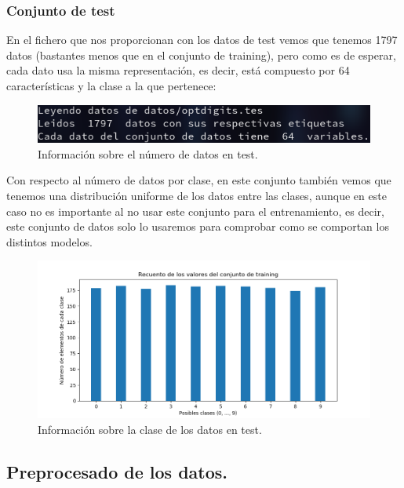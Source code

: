 \documentclass[12pt, spanish]{article}
\begin{document}
\subsubsection{Conjunto de test}

En el fichero que nos proporcionan con los datos de test vemos que tenemos 1797 datos (bastantes menos que en el conjunto de training), pero como es de esperar, cada dato usa la misma representación, es decir, está compuesto por 64 características y la clase a la que pertenece:

\begin{figure}[H]
	\centering
	\includegraphics[scale=0.7]{clasificacion/num_datos_test.png}
	\caption{Información sobre el número de datos  en test.}
	\label{datosClasificacionTest}
\end{figure}


Con respecto al número de datos por clase, en este conjunto también vemos que tenemos una distribución uniforme de los datos entre las clases, aunque en este caso no es importante al no usar este conjunto para el entrenamiento, es decir, este conjunto de datos solo lo usaremos para comprobar como se comportan los distintos modelos.

\begin{figure}[H]
	\centering
	\includegraphics[scale=0.7]{clasificacion/datos_test.png}
	\caption{Información sobre la clase de los datos en test.}
	\label{claseDatosTestClasificacion}
\end{figure}

\newpage

\subsection{Preprocesado de los datos.}
\end{document}
